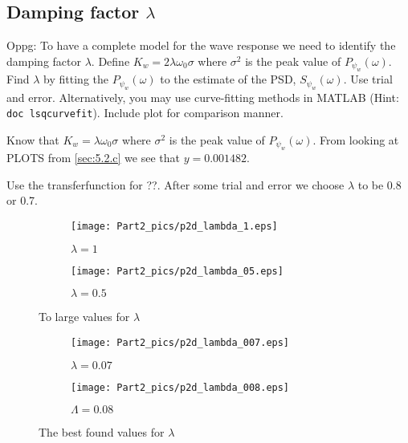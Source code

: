 \subsection{Damping factor $\lambda$} \label{sec:5.2.d}
Oppg: To have a complete model for the wave response we need to identify the damping factor $\lambda$. Define $K_w = 2 \lambda \omega_0 \sigma$ where $\sigma^2$ is the peak value of $P_{\psi_w}(\omega)$. Find $\lambda$ by fitting the $P_{\psi_w}(\omega)$ to the estimate of the PSD, $S_{\psi_w}(\omega)$. Use trial and error. Alternatively, you may use curve-fitting methods in MATLAB (Hint: \texttt{doc lsqcurvefit}). Include plot for comparison manner.
\newline

Know that $K_w = \lambda \omega_0 \sigma$ where $\sigma^2$ is the peak value of $P_{\psi_w}(\omega)$. From looking at PLOTS from \cref{sec:5.2.c} we see that $y = 0.001482$. 

Use the transferfunction for ??. After some trial and error we choose $\lambda$ to be 0.8 or 0.7.

\begin{figure}[H]
\begin{subfigure}{0.5\textwidth}
    \texttt{[image: Part2\_pics/p2d\_lambda\_1.eps]}
    \caption{$\lambda = 1$}
\end{subfigure}
\begin{subfigure}{0.5\textwidth}
    \texttt{[image: Part2\_pics/p2d\_lambda\_05.eps]}
    \caption{$\lambda = 0.5$}
\end{subfigure}
\caption{To large values for $\lambda$}
\label{fig:p2d1}
\end{figure}

\begin{figure}[H]
\begin{subfigure}{0.5\textwidth}
    \texttt{[image: Part2\_pics/p2d\_lambda\_007.eps]}
    \caption{$\lambda = 0.07$}
\end{subfigure}
\begin{subfigure}{0.5\textwidth}
    \texttt{[image: Part2\_pics/p2d\_lambda\_008.eps]}
    \caption{$\Lambda = 0.08$}
\end{subfigure}
\caption{The best found values for $\lambda$}
\label{fig:p2d2}
\end{figure}